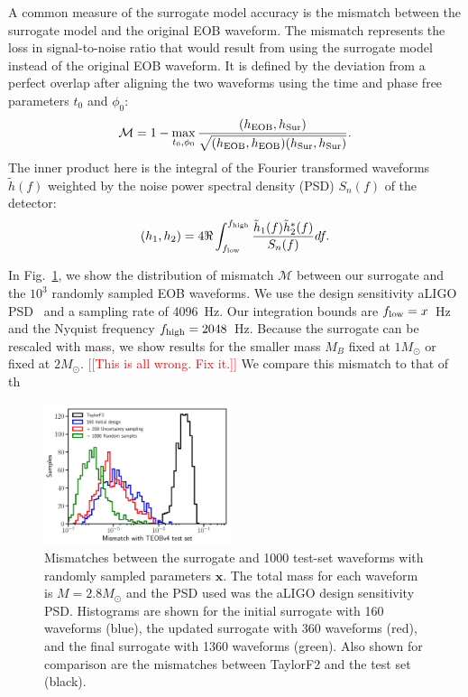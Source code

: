 \documentclass[prd,aps,letter,twocolumn,floatfix,notitlepage,nofootinbib]{revtex4-1}
\def\bx{\mathbf{x}}
\newcommand{\red}[1]{\textcolor{red}{#1}}
\begin{document}
A common measure of the surrogate model accuracy is the mismatch between 
the surrogate model and the original EOB waveform.
The mismatch represents the loss in signal-to-noise ratio that would result 
from using the surrogate model instead of the original EOB waveform. 
It is defined by the deviation from a perfect overlap after aligning the two waveforms
using the time and phase free parameters $t_0$ and $\phi_0$:
\begin{equation}
\mathcal{M} = 1 - \max_{t_0, \phi_0} \frac{(h_{\rm EOB}, h_{\rm Sur})} {\sqrt{(h_{\rm EOB}, h_{\rm EOB}) (h_{\rm Sur}, h_{\rm Sur})}}.
\end{equation}
The inner product here  is the integral of the Fourier transformed waveforms $\tilde h(f)$ weighted by the noise power spectral 
density (PSD) $S_n(f)$ of the detector:
\begin{equation}
(h_1, h_2) = 4 \Re \int_{f_{\rm low}}^{f_{\rm high}} \frac{\tilde h_1(f) \tilde h^*_2(f)} {S_n(f)} df.
\end{equation}

In Fig.~\ref{fig:mismatch}, we show the distribution of mismatch $\mathcal{M}$ between our surrogate
and the $10^3$ randomly sampled EOB waveforms. We use the design sensitivity aLIGO PSD~\cite{Aasi:2013wya} and
a sampling rate of 4096~Hz. Our integration bounds are $f_{\rm low} = x$~Hz and the Nyquist frequency
$f_{\rm high} = 2048$~Hz. Because the surrogate can be rescaled with mass,
we show results for the smaller mass $M_B$ fixed at $1M_\odot$ or fixed at $2M_\odot$.
\red{[[This is all wrong. Fix it.]]}
We compare this mismatch to that of th

\begin{figure}[htb]
\centering
\includegraphics[width=0.49\textwidth]{mismatch.pdf}
\caption{Mismatches between the surrogate and 1000 test-set waveforms with randomly sampled parameters $\bx$. The total mass for each waveform is $M=2.8M_\odot$ and the PSD used was the aLIGO design sensitivity PSD. Histograms are shown for the initial surrogate with 160 waveforms (blue), the updated surrogate with 360 waveforms (red), and the final surrogate with 1360 waveforms (green). Also shown for comparison are the mismatches between TaylorF2 and the test set (black).}
\label{fig:mismatch}
\end{figure}
\end{document}
